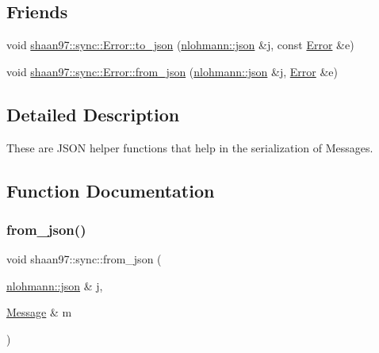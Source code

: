 \subsection*{Friends}
\begin{DoxyCompactItemize}
\item 
void \hyperlink{group___serialization_ga06e5a619d8d673a3bb00b006e62bbe1e}{shaan97\+::sync\+::\+Error\+::to\+\_\+json} (\hyperlink{namespacenlohmann_a2bfd99e845a2e5cd90aeaf1b1431f474}{nlohmann\+::json} \&j, const \hyperlink{classshaan97_1_1sync_1_1_error}{Error} \&e)
\item 
void \hyperlink{group___serialization_ga827d73b9e95e7aa59bf1b159251bedf3}{shaan97\+::sync\+::\+Error\+::from\+\_\+json} (\hyperlink{namespacenlohmann_a2bfd99e845a2e5cd90aeaf1b1431f474}{nlohmann\+::json} \&j, \hyperlink{classshaan97_1_1sync_1_1_error}{Error} \&e)
\end{DoxyCompactItemize}


\subsection{Detailed Description}
These are J\+S\+ON helper functions that help in the serialization of {\ttfamily Messages}. 

\subsection{Function Documentation}
\mbox{\label{group___serialization_gaba06015bb8b13049b093f0bde8e89377}} 
\subsubsection{\texorpdfstring{from\+\_\+json()}{from\_json()}\hspace{0.1cm}{\footnotesize\ttfamily [1/2]}}
{\footnotesize\ttfamily void shaan97\+::sync\+::from\+\_\+json (\begin{DoxyParamCaption}\item[{\hyperlink{namespacenlohmann_a2bfd99e845a2e5cd90aeaf1b1431f474}{nlohmann\+::json} \&}]{j,  }\item[{\hyperlink{structshaan97_1_1sync_1_1_message}{Message} \&}]{m }\end{DoxyParamCaption})}



